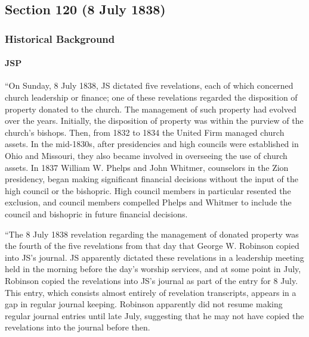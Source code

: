 \subsection{Section 120 (8 July 1838)}
	\label{DC120}
	
	\subsubsection{Historical Background}
		\label{DC120-HB}
		
		\paragraph{JSP}
		
			``On Sunday, 8 July 1838, JS dictated five revelations, each of which concerned church leadership or finance; one of these revelations regarded the disposition of property donated to the church. The management of such property had evolved over the years. Initially, the disposition of property was within the purview of the church's bishops. Then, from 1832 to 1834 the United Firm managed church assets. In the mid-1830s, after presidencies and high councils were established in Ohio and Missouri, they also became involved in overseeing the use of church assets. In 1837 William W. Phelps and John Whitmer, counselors in the Zion presidency, began making significant financial decisions without the input of the high council or the bishopric. High council members in particular resented the exclusion, and council members compelled Phelps and Whitmer to include the council and bishopric in future financial decisions.
			
			``The 8 July 1838 revelation regarding the management of donated property was the fourth of the five revelations from that day that George W. Robinson copied into JS's journal. JS apparently dictated these revelations in a leadership meeting held in the morning before the day's worship services, and at some point in July, Robinson copied the revelations into JS's journal as part of the entry for 8 July. This entry, which consists almost entirely of revelation transcripts, appears in a gap in regular journal keeping. Robinson apparently did not resume making regular journal entries until late July, suggesting that he may not have copied the revelations into the journal before then.
			

